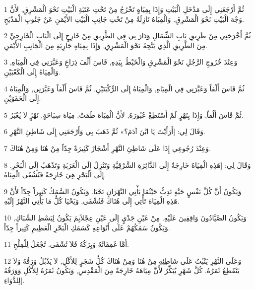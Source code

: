\par 1 ثُمَّ أَرْجَعَنِي إِلَى مَدْخَلِ الْبَيْتِ وَإِذَا بِمِيَاهٍ تَخْرُجُ مِنْ تَحْتِ عَتَبَةِ الْبَيْتِ نَحْوَ الْمَشْرِقِ, لأَنَّ وَجْهَ الْبَيْتِ نَحْوَ الْمَشْرِقِ. وَالْمِيَاهُ نَازِلَةٌ مِنْ تَحْتِ جَانِبِ الْبَيْتِ الأَيْمَنِ عَنْ جَنُوبِ الْمَذْبَحِ.
\par 2 ثُمَّ أَخْرَجَنِي مِنْ طَرِيقِ بَابِ الشِّمَالِ وَدَارَ بِي فِي الطَّرِيقِ مِنْ خَارِجٍ إِلَى الْبَابِ الْخَارِجِيِّ مِنَ الطَّرِيقِ الَّذِي يَتَّجِهُ نَحْوَ الْمَشْرِقِ, وَإِذَا بِمِيَاهٍ جَارِيَةٍ مِنَ الْجَانِبِ الأَيْمَنِ.
\par 3 وَعِنْدَ خُرُوجِ الرَّجُلِ نَحْوَ الْمَشْرِقِ وَالْخَيْطُ بِيَدِهِ, قَاسَ أَلْفَ ذِرَاعٍ وَعَبَّرَنِي فِي الْمِيَاهِ, وَالْمِيَاهُ إِلَى الْكَعْبَيْنِ.
\par 4 ثُمَّ قَاسَ أَلْفاً وَعَبَّرَنِي فِي الْمِيَاهِ, وَالْمِيَاهُ إِلَى الرُّكْبَتَيْنِ. ثُمَّ قَاسَ أَلْفاً وَعَبَّرَنِي, وَالْمِيَاهُ إِلَى الْحَقَوَيْنِ.
\par 5 ثُمَّ قَاسَ أَلْفاً, وَإِذَا بِنَهْرٍ لَمْ أَسْتَطِعْ عُبُورَهُ, لأَنَّ الْمِيَاهَ طَمَتْ, مِيَاهَ سِبَاحَةٍ, نَهْرٌٍ لاَ يُعْبَرُ.
\par 6 وَقَالَ لِي: [أَرَأَيْتَ يَا ابْنَ آدَمَ؟» ثُمَّ ذَهَبَ بِي وَأَرْجَعَنِي إِلَى شَاطِئِ النَّهْرِ.
\par 7 وَعِنْدَ رُجُوعِي إِذَا عَلَى شَاطِئِ النَّهْرِ أَشْجَارٌ كَثِيرَةٌ جِدّاً مِنْ هُنَا وَمِنْ هُنَاكَ.
\par 8 وَقَالَ لِي: [هَذِهِ الْمِيَاهُ خَارِجَةٌ إِلَى الدَّائِرَةِ الشَّرْقِيَّةِ وَتَنْزِلُ إِلَى الْعَرَبَةِ وَتَذْهَبُ إِلَى الْبَحْرِ. إِلَى الْبَحْرِ هِيَ خَارِجَةٌ فَتُشْفَى الْمِيَاهُ.
\par 9 وَيَكُونُ أَنَّ كُلَّ نَفْسٍ حَيَّةٍ تَدِبُّ حَيْثُمَا يَأْتِي النَّهْرَانِ تَحْيَا. وَيَكُونُ السَّمَكُ كَثِيراً جِدّاً لأَنَّ هَذِهِ الْمِيَاهَ تَأْتِي إِلَى هُنَاكَ فَتُشْفَى, وَيَحْيَا كُلُّ مَا يَأْتِي النَّهْرُ إِلَيْهِ.
\par 10 وَيَكُونُ الصَّيَّادُونَ وَاقِفِينَ عَلَيْهِ. مِنْ عَيْنِ جَدْيٍ إِلَى عَيْنِ عِجْلاَيِمَ يَكُونُ لِبَسْطِ الشِّبَاكِ, وَيَكُونُ سَمَكُهُمْ عَلَى أَنْوَاعِهِ كَسَمَكِ الْبَحْرِ الْعَظِيمِ كَثِيراً جِدّاً.
\par 11 أَمَّا غَمِقَاتُهُ وَبِرَكُهُ فَلاَ تُشْفَى. تُجْعَلُ لِلْمِلْحِ.
\par 12 وَعَلَى النَّهْرِ يَنْبُتُ عَلَى شَاطِئِهِ مِنْ هُنَا وَمِنْ هُنَاكَ كُلُّ شَجَرٍ لِلأَكْلِ, لاَ يَذْبُلُ وَرَقُهُ وَلاَ يَنْقَطِعُ ثَمَرُهُ. كُلَّ شَهْرٍ يُبَكِّرُ لأَنَّ مِيَاهَهُ خَارِجَةٌ مِنَ الْمَقْدِسِ, وَيَكُونُ ثَمَرُهُ لِلأَكْلِ وَوَرَقُهُ لِلدَّوَاءِ].
